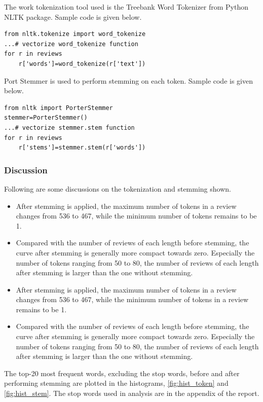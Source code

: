 \documentclass[sigconf]{acmart}
\begin{document}
The work tokenization tool used is the Treebank Word Tokenizer from Python NLTK package. Sample code is given below.
\begin{verbatim}
from nltk.tokenize import word_tokenize
...# vectorize word_tokenize function
for r in reviews
    r['words']=word_tokenize(r['text'])
\end{verbatim}

Port Stemmer is used to perform stemming on each token. Sample code is given below.
\begin{verbatim}
from nltk import PorterStemmer
stemmer=PorterStemmer()
...# vectorize stemmer.stem function
for r in reviews
    r['stems']=stemmer.stem(r['words'])
\end{verbatim}

\subsubsection{Discussion} Following are some discussions on the tokenization and stemming shown.
\begin{itemize}
\item After stemming is applied, the maximum number of tokens in a review changes from 536 to 467, while the minimum number of tokens remains to be 1.
\item Compared with the number of reviews of each length before stemming, the curve after stemming is generally more compact towards zero. Especially the number of tokens ranging from 50 to 80, the number of reviews of each length after stemming is larger than the one without stemming.
\end{itemize}

\begin{itemize}
\item After stemming is applied, the maximum number of tokens in a review changes from 536 to 467, while the minimum number of tokens in a review remains to be 1.
\item Compared with the number of reviews of each length before stemming, the curve after stemming is generally more compact towards zero. Especially the number of tokens ranging from 50 to 80, the number of reviews of each length after stemming is larger than the one without stemming.
\end{itemize}

The top-20 most frequent words, excluding the stop words, before and after performing stemming are plotted in the histograms, \ref{fig:hist_token} and \ref{fig:hist_stem}. The stop words used in analysis are in the appendix of the report.
\end{document}
